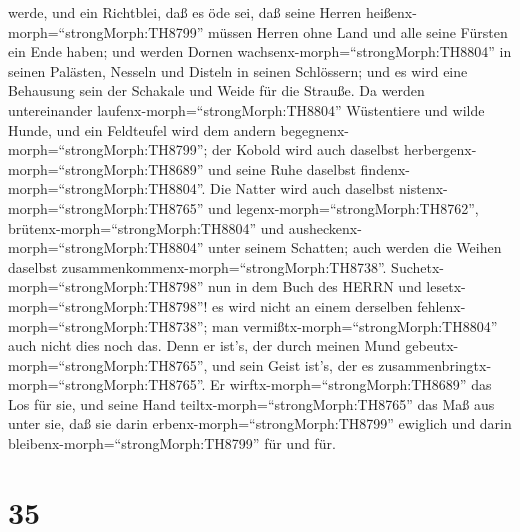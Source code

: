 werde, und ein Richtblei, daß es öde sei,  daß seine Herren
heißenx-morph=``strongMorph:TH8799'' müssen Herren ohne Land und alle
seine Fürsten ein Ende haben;  und werden Dornen
wachsenx-morph=``strongMorph:TH8804'' in seinen Palästen, Nesseln und
Disteln in seinen Schlössern; und es wird eine Behausung sein der
Schakale und Weide für die Strauße.  Da werden
untereinander laufenx-morph=``strongMorph:TH8804'' Wüstentiere und wilde
Hunde, und ein Feldteufel wird dem andern
begegnenx-morph=``strongMorph:TH8799''; der Kobold wird auch daselbst
herbergenx-morph=``strongMorph:TH8689'' und seine Ruhe daselbst
findenx-morph=``strongMorph:TH8804''.  Die Natter wird auch
daselbst nistenx-morph=``strongMorph:TH8765'' und
legenx-morph=``strongMorph:TH8762'',
brütenx-morph=``strongMorph:TH8804'' und
ausheckenx-morph=``strongMorph:TH8804'' unter seinem Schatten; auch
werden die Weihen daselbst zusammenkommenx-morph=``strongMorph:TH8738''.
 Suchetx-morph=``strongMorph:TH8798'' nun in dem Buch des
HERRN und lesetx-morph=``strongMorph:TH8798''! es wird nicht an einem
derselben fehlenx-morph=``strongMorph:TH8738''; man
vermißtx-morph=``strongMorph:TH8804'' auch nicht dies noch das. Denn er
ist's, der durch meinen Mund gebeutx-morph=``strongMorph:TH8765'', und
sein Geist ist's, der es zusammenbringtx-morph=``strongMorph:TH8765''.
 Er wirftx-morph=``strongMorph:TH8689'' das Los für sie,
und seine Hand teiltx-morph=``strongMorph:TH8765'' das Maß aus unter
sie, daß sie darin erbenx-morph=``strongMorph:TH8799'' ewiglich und
darin bleibenx-morph=``strongMorph:TH8799'' für und für.

\hypertarget{section-34}{%
\section{35}\label{section-34}}

